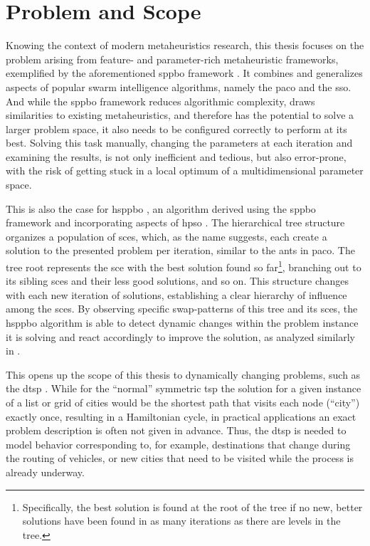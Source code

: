 \section{Problem and Scope}

Knowing the context of modern metaheuristics research, this thesis focuses on the problem arising from feature- and parameter-rich metaheuristic frameworks, exemplified by the aforementioned \gls{sppbo} framework \cite{lin2015simple}. It combines and generalizes aspects of popular swarm intelligence algorithms, namely the \gls{paco} and the \gls{sso}. And while the \gls{sppbo} framework reduces algorithmic complexity, draws similarities to existing metaheuristics, and therefore has the potential to solve a larger problem space, it also needs to be configured correctly to perform at its best. Solving this task manually, changing the parameters at each iteration and examining the results, is not only inefficient and tedious, but also error-prone, with the risk of getting stuck in a local optimum of a multidimensional parameter space.

This is also the case for \gls{hsppbo} \cite{kupfer2021hierarchical}, an algorithm derived using the \gls{sppbo} framework and incorporating aspects of \gls{hpso} \cite{janson2003hierarchical}. The hierarchical tree structure organizes a population of \glspl{sce}, which, as the name suggests, each create a solution to the presented problem per iteration, similar to the ants in \gls{paco}. The tree root represents the \gls{sce} with the best solution found so far\footnote{Specifically, the best solution is found at the root of the tree if no new, better solutions have been found in as many iterations as there are levels in the tree.}, branching out to its sibling \glspl{sce} and their less good solutions, and so on. This structure changes with each new iteration of solutions, establishing a clear hierarchy of influence among the \glspl{sce}. By observing specific swap-patterns of this tree and its \glspl{sce}, the \gls{hsppbo} algorithm is able to detect dynamic changes within the problem instance it is solving and react accordingly to improve the solution, as analyzed similarly in \cite{janson2004hierarchical}.

This opens up the scope of this thesis to dynamically changing problems, such as the \gls{dtsp} \cite{psaraftis1995dynamic}. While for the \enquote{normal} symmetric \gls{tsp} the solution for a given instance of a list or grid of cities would be the shortest path that visits each node (\enquote{city}) exactly once, resulting in a Hamiltonian cycle, in practical applications an exact problem description is often not given in advance. Thus, the \gls{dtsp} is needed to model behavior corresponding to, for example, destinations that change during the routing of vehicles, or new cities that need to be visited while the process is already underway.


